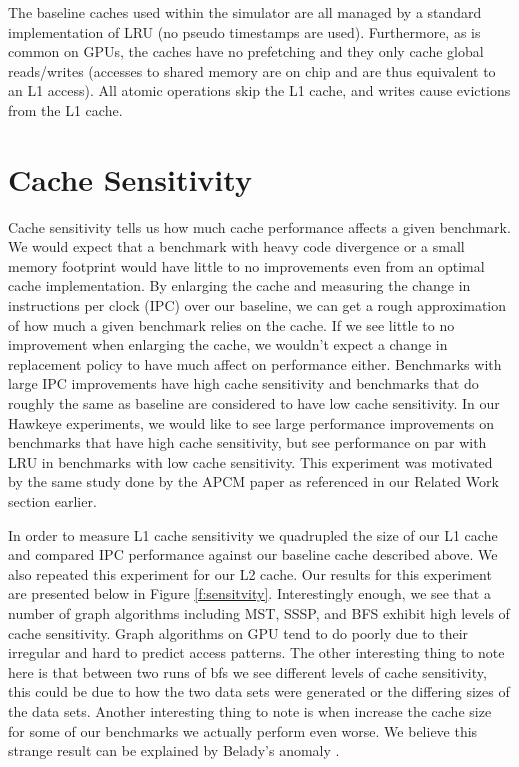 The baseline caches used within the simulator are all managed by a standard implementation of LRU (no pseudo timestamps are used). Furthermore, as is common on GPUs, the caches have no prefetching and they only cache global reads/writes (accesses to shared memory are on chip and are thus equivalent to an L1 access). All atomic operations skip the L1 cache, and writes cause evictions from the L1 cache.

\section{Cache Sensitivity}
Cache sensitivity tells us how much cache performance affects a given benchmark. We would expect that a benchmark with heavy code divergence or a small memory footprint would have little to no improvements even from an optimal cache implementation. By enlarging the cache and measuring the change in instructions per clock (IPC) over our baseline, we can get a rough approximation of how much a given benchmark relies on the cache. If we see little to no improvement when enlarging the cache, we wouldn't expect a change in replacement policy to have much affect on performance either. Benchmarks with large IPC improvements have high cache sensitivity and benchmarks that do roughly the same as baseline are considered to have low cache sensitivity. In our Hawkeye experiments, we would like to see large performance improvements on benchmarks that have high cache sensitivity, but see performance on par with LRU in benchmarks with low cache sensitivity. This experiment was motivated by the same study done by the APCM paper as referenced in our Related Work section earlier.

In order to measure L1 cache sensitivity we quadrupled the size of our L1 cache and compared IPC performance against our baseline cache described above. We also repeated this experiment for our L2 cache. Our results for this experiment are presented below in Figure \ref{f:sensitvity}. Interestingly enough, we see that a number of graph algorithms including MST, SSSP, and BFS exhibit high levels of cache sensitivity. Graph algorithms on GPU tend to do poorly due to their irregular and hard to predict access patterns. The other interesting thing to note here is that between two runs of bfs we see different levels of cache sensitivity, this could be due to how the two data sets were generated or the differing sizes of the data sets. Another interesting thing to note is when increase the cache size for some of our benchmarks we actually perform even worse. We believe this strange result can be explained by Belady’s anomaly \cite{belady_anomaly}.

